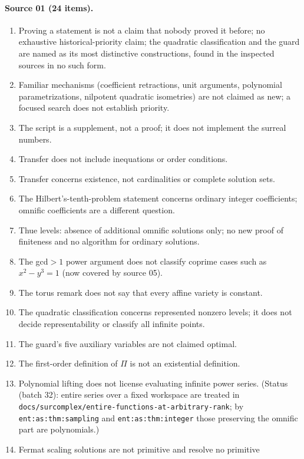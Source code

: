 \documentclass[11pt,oneside]{article}
\numberwithin{equation}{section}
\theoremstyle{definition}
\theoremstyle{remark}
\newcommand{\replabel}[1]{\nolinkurl{#1}}
\newcommand{\fn}[1]{\nolinkurl{#1}}
\begin{document}
\paragraph{Source 01 (24 items).}
\begin{enumerate}[leftmargin=*,itemsep=1pt]
\item Proving a statement is not a claim that nobody proved it before; no
exhaustive historical-priority claim; the quadratic classification and the
guard are named as its most distinctive constructions, found in the inspected
sources in no such form.
\item Familiar mechanisms (coefficient retractions, unit arguments, polynomial
parametrizations, nilpotent quadratic isometries) are not claimed as new; a
focused search does not establish priority.
\item The script is a supplement, not a proof; it does not implement the
surreal numbers.
\item Transfer does not include inequations or order conditions.
\item Transfer concerns existence, not cardinalities or complete solution
sets.
\item The Hilbert's-tenth-problem statement concerns ordinary integer
coefficients; omnific coefficients are a different question.
\item Thue levels: absence of additional omnific solutions only; no new proof
of finiteness and no algorithm for ordinary solutions.
\item The gcd$>1$ power argument does not classify coprime cases such as
$x^2-y^3=1$ (now covered by source 05).
\item The torus remark does not say that every affine variety is constant.
\item The quadratic classification concerns represented nonzero levels; it
does not decide representability or classify all infinite points.
\item The guard's five auxiliary variables are not claimed optimal.
\item The first-order definition of $\Pi$ is not an existential definition.
\item Polynomial lifting does not license evaluating infinite power series.
(Status (batch 32): entire series over a fixed workspace are treated in
\fn{docs/surcomplex/entire-functions-at-arbitrary-rank};
by \replabel{ent:as:thm:sampling} and \replabel{ent:as:thm:integer} those
preserving the omnific part are polynomials.)
\item Fermat scaling solutions are not primitive and resolve no primitive

\end{enumerate}
\end{document}
